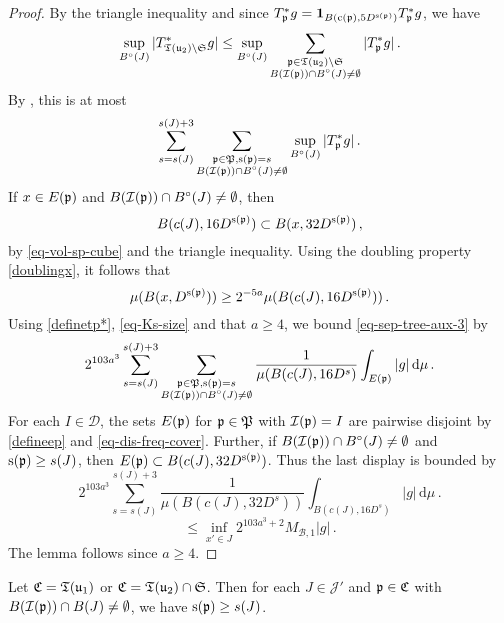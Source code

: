     \begin{proof}
        By the triangle inequality and since $T_{{\mathfrak p}}^* g = \mathbf{1}_{B({\mathrm{c}}({\mathfrak p}), 5D^{{\mathrm{s}}({\mathfrak p})})} T_{{\mathfrak p}}^* g$, we have
        $$
            \sup_{B^\circ{}(J)} |T_{{\mathfrak T}({\mathfrak u}_2) \setminus\mathfrak{S}}^* g|
            \leq \sup_{B^\circ{}(J)} \sum_{\substack{{\mathfrak p} \in {\mathfrak T}({\mathfrak u}_2) \setminus \mathfrak{S}\\ B({\mathcal{I}}({\mathfrak p})) \cap B^\circ(J) \ne \emptyset}} |T_{{\mathfrak p}}^*g|\,.
        $$
        By , this is at most
      \begin{equation}
            \label{eq-sep-tree-aux-3}
            \sum_{s = s(J)}^{s(J) + 3} \sum_{\substack{{\mathfrak p} \in {\mathfrak P}, {\mathrm{s}}({\mathfrak p}) = s\\ B({\mathcal{I}}({\mathfrak p})) \cap B^\circ(J) \ne \emptyset}} \sup_{B^\circ{}(J)} |T_{{\mathfrak p}}^* g|\,.
        \end{equation}
        If $x \in E({\mathfrak p})$ and $B({\mathcal{I}}({\mathfrak p})) \cap B^\circ(J) \ne \emptyset$, then
        $$
            B(c(J), 16D^{{\mathrm{s}}({\mathfrak p})}) \subset B(x, 32 D^{{\mathrm{s}}({\mathfrak p})})\,,
        $$
        by \eqref{eq-vol-sp-cube} and the triangle inequality. Using the doubling property \eqref{doublingx}, it follows that
        $$
            \mu(B(x, D^{{\mathrm{s}}({\mathfrak p})})) \ge 2^{-5a} \mu(B(c(J), 16D^{{\mathrm{s}}({\mathfrak p})}))\,.
        $$
        Using \eqref{definetp*}, \eqref{eq-Ks-size} and that $a \ge 4$, we bound \eqref{eq-sep-tree-aux-3} by
        $$
            2^{103a^3}\sum_{s = s(J)}^{s(J) + 3} \sum_{\substack{{\mathfrak p} \in {\mathfrak P}, {\mathrm{s}}({\mathfrak p}) = s\\B({\mathcal{I}}({\mathfrak p})) \cap B^\circ(J) \ne \emptyset}} \frac{1}{\mu(B(c(J), 16 D^s)} \int_{E({\mathfrak p})} |g| \, \mathrm{d}\mu\,.
        $$
        For each $I \in \mathcal{D}$, the sets $E({\mathfrak p})$ for ${\mathfrak p} \in {\mathfrak P}$ with ${\mathcal{I}}({\mathfrak p}) = I$ are pairwise disjoint by \eqref{defineep} and \eqref{eq-dis-freq-cover}. Further, if $B({\mathcal{I}}({\mathfrak p})) \cap B^\circ(J) \ne \emptyset$ and ${\mathrm{s}}({\mathfrak p}) \ge s(J)$, then $E({\mathfrak p}) \subset B(c(J), 32 D^{{\mathrm{s}}({\mathfrak p})})$. Thus the last display is bounded by
        $$
            2^{103a^3}\sum_{s = s(J)}^{s(J) + 3} \frac{1}{\mu(B(c(J), 32 D^s))} \int_{B(c(J), 16 D^s)} |g| \, \mathrm{d}\mu\,.
        $$
        $$
            \le \inf_{x' \in J} 2^{103a^3 +2} M_{\mathcal{B}, 1} |g|\,.
        $$
        The lemma follows since $a \ge 4$.
    \end{proof}

    \begin{lemma}
        \label{scales-impacting-interval}
        \leanok
        Let ${\mathfrak C} = {\mathfrak T}({\mathfrak u}_1)$ or ${\mathfrak C} = {\mathfrak T}({\mathfrak u}_2) \cap \mathfrak{S}$. Then for each $J \in \mathcal{J}'$ and ${\mathfrak p} \in {\mathfrak C}$ with $B({\mathcal{I}}({\mathfrak p})) \cap B(J) \neq \emptyset$, we have ${\mathrm{s}}({\mathfrak p}) \ge s(J)$.
    \end{lemma}

